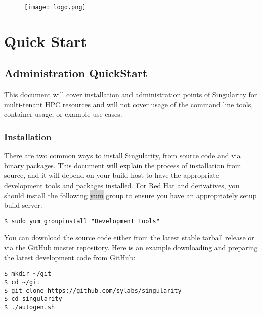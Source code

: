 \documentclass[a4paper]{article}
\date{\vspace{-5ex}}
\newcounter{subsubsubsection}[subsubsection]
\begin{document}
\lstset{language=bash}          %
\lstset{basicstyle = \ttfamily,columns=fullflexible}

\begin{figure}
\centering
{\texttt{[image: logo.png]}}
\end{figure}

\justify


\section{Quick Start}
\label{sec:quickstart}
 
\subsection{Administration QuickStart}
This document will cover installation and administration points of Singularity for multi-tenant HPC resources and will not cover usage of the command line tools, container usage, or example use cases.

\newpage


\tableofcontents
\newpage


\subsubsection{Installation}

There are two common ways to install Singularity, from source code and via binary packages. This document will explain the process of installation from source, and it will depend on your build host to have the appropriate development tools and packages installed. For Red Hat and derivatives, you should install the following \colorbox{lightgray}{yum} group to ensure you have an appropriately setup build server:
    
\begin{lstlisting}[frame=single]
$ sudo yum groupinstall "Development Tools"
\end{lstlisting}



You can download the source code either from the latest stable tarball release or via the GitHub master repository. Here is an example downloading and preparing the latest development code from GitHub:

\begin{lstlisting}[frame=single]
$ mkdir ~/git
$ cd ~/git
$ git clone https://github.com/sylabs/singularity
$ cd singularity
$ ./autogen.sh
\end{lstlisting}
\end{document}
